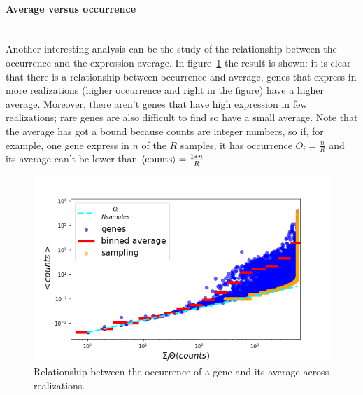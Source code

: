 \paragraph{Average versus occurrence}\mbox{}\\
Another interesting analysis can be the study of the relationship between the occurrence and the expression average. In figure~\ref{fig:scalinglaws/gtex/meanDiff_binned_sampling} the result is shown: it is clear that there is a relationship between occurrence and average, genes that express in more realizations (higher occurrence and right in the figure) have a higher average. Moreover, there aren't genes that have high expression in few realizations; rare genes are also difficult to find so have a small average. Note that the average has got a bound because counts are integer numbers, so if, for example, one gene express in $n$ of the $R$ samples, it has occurrence $O_i=\frac{n}{R}$ and its average can't be lower than $\left\langle \mathrm{counts}\right\rangle=\frac{1*n}{R}$
\begin{figure}[htb!]
    \centering
    \includegraphics[width=0.9\linewidth]{pictures/scalinglaws/gtex/meanDiff_binned_sampling.png}
    \caption{Relationship between the occurrence of a gene and its average across realizations.}
    \label{fig:scalinglaws/gtex/meanDiff_binned_sampling}
\end{figure}
